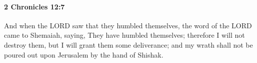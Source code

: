 
		\paragraph{2 Chronicles 12:7} %
			\label{2CHRONICLES-12-7}

			And when the LORD saw that they humbled themselves, the word of the LORD came to Shemaiah, saying, They have humbled themselves; therefore I will not destroy them, but I will grant them some deliverance; and my wrath shall not be poured out upon Jerusalem by the hand of Shishak.


